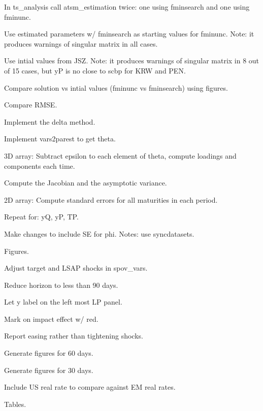 \documentclass[12pt]{article}
\newcommand{\cmark}{\ding{51}}
\newcommand{\done}{\rlap{$\square$}{\raisebox{2pt}{\large\hspace{1pt}\cmark}}%
	\hspace{-2.5pt}}
\begin{document}
\begin{todolist}
\begin{todolist}
		\item[\done] In ts_analysis call atsm_estimation twice: one using fminsearch and one using fminunc.
		\item[\done] Use estimated parameters w/ fminsearch as starting values for fminunc. Note: it produces warnings of singular matrix in all cases.
		\item[\done] Use intial values from JSZ. Note: it produces warnings of singular matrix in 8 out of 15 cases, but yP is no close to scbp for KRW and PEN.
		\item[\done] Compare solution vs intial values (fminunc vs fminsearch) using figures.
		\item[\done] Compare RMSE.
	\end{todolist}
	\item[\done] Implement the delta method.
	\begin{todolist}
		\item[\done] Implement vars2parest to get theta.
		\item[\done] 3D array: Subtract epsilon to each element of theta, compute loadings and components each time.
		\item[\done] Compute the Jacobian and the asymptotic variance.
		\item[\done] 2D array: Compute standard errors for all maturities in each period.
		\item[\done] Repeat for: yQ, yP, TP.
		\item[\done] Make changes to include SE for phi. Notes: use syncdatasets.
	\end{todolist}
	\item[\done] Figures.
	\begin{todolist}
		\item[\done] Adjust target and LSAP shocks in spov_vars.
		\item[\done] Reduce horizon to less than 90 days.
		\item[\done] Let y label on the left most LP panel.
		\item[\done] Mark on impact effect w/ red.
		\item[\done] Report easing rather than tightening shocks.
		\item[\done] Generate figures for 60 days.
		\item[\done] Generate figures for 30 days.
		\item[\done] Include US real rate to compare against EM real rates.
	\end{todolist}
	\item[\done] Tables.

\end{todolist}
\end{document}
